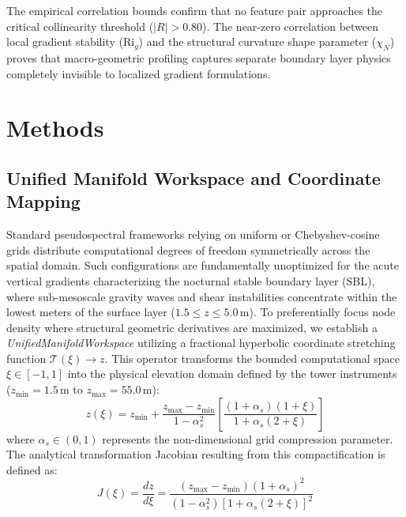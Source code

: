 \documentclass[11pt,a4paper]{article}
\begin{document}
The empirical correlation bounds confirm that no feature pair approaches the critical collinearity threshold ($|R| > 0.80$). The near-zero correlation between local gradient stability ($\mathrm{Ri}_g$) and the structural curvature shape parameter ($\chi_N$) proves that macro-geometric profiling captures separate boundary layer physics completely invisible to localized gradient formulations.

\section{Methods}
\label{sec:methods}

\subsection{Unified Manifold Workspace and Coordinate Mapping}
\label{sec:methods:manifold}

Standard pseudospectral frameworks relying on uniform or Chebyshev-cosine grids distribute computational degrees of freedom symmetrically across the spatial domain. Such configurations are fundamentally unoptimized for the acute vertical gradients characterizing the nocturnal stable boundary layer (SBL), where sub-mesoscale gravity waves and shear instabilities concentrate within the lowest meters of the surface layer ($1.5 \le z \le 5.0\,\text{m}$). To preferentially focus node density where structural geometric derivatives are maximized, we establish a \emph{UnifiedManifoldWorkspace} utilizing a fractional hyperbolic coordinate stretching function $\mathcal{T}(\xi) \rightarrow z$. This operator transforms the bounded computational space $\xi \in [-1, 1]$ into the physical elevation domain defined by the tower instruments ($z_{\min} = 1.5\,\text{m}$ to $z_{\max} = 55.0\,\text{m}$):
\begin{equation}
z(\xi) = z_{\min} + \frac{z_{\max} - z_{\min}}{1 - \alpha_s^2} \left[ \frac{(1+\alpha_s)(1+\xi)}{1 + \alpha_s(2+\xi)} \right]
\label{eq:hyperbolic_stretch}
\end{equation}
where $\alpha_s \in (0, 1)$ represents the non-dimensional grid compression parameter. The analytical transformation Jacobian resulting from this compactification is defined as:
\begin{equation}
J(\xi) = \frac{dz}{d\xi} = \frac{(z_{\max} - z_{\min})(1 + \alpha_s)^2}{(1 - \alpha_s^2) \left[1 + \alpha_s(2+\xi)\right]^2}
\label{eq:jacobian_stretched}
\end{equation}
\end{document}
